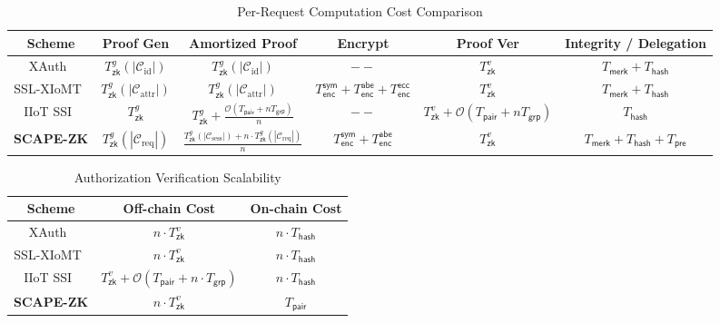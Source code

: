 \documentclass[conference]{IEEEtran}
\begin{document}
\begin{table}[t]
\centering
\caption{Per-Request Computation Cost Comparison}
\label{tab:cost-unified}
\begin{tabular}{c|c|c|c|c|c}
\hline
\textbf{Scheme} 
& \textbf{Proof Gen} 
& \textbf{Amortized Proof} 
& \textbf{Encrypt} 
& \textbf{Proof Ver} 
& \textbf{Integrity / Delegation} \\
\hline

XAuth~\cite{b6}
& $T_{\mathsf{zk}}^{g}(|\mathcal{C}_{\mathrm{id}}|)$
& $T_{\mathsf{zk}}^{g}(|\mathcal{C}_{\mathrm{id}}|)$
& $--$
& $T_{\mathsf{zk}}^{v}$
& $T_{\mathsf{merk}} + T_{\mathsf{hash}}$ \\
\hline

SSL-XIoMT~\cite{b8}
& $T_{\mathsf{zk}}^{g}(|\mathcal{C}_{\mathrm{attr}}|)$
& $T_{\mathsf{zk}}^{g}(|\mathcal{C}_{\mathrm{attr}}|)$
& $T_{\mathsf{enc}}^{\mathsf{sym}} + T_{\mathsf{enc}}^{\mathsf{abe}} + T_{\mathsf{enc}}^{\mathsf{ecc}}$
& $T_{\mathsf{zk}}^{v}$
& $T_{\mathsf{merk}} + T_{\mathsf{hash}}$ \\
\hline

IIoT SSI~\cite{b30}
& $T_{\mathsf{zk}}^{g}$
& $\displaystyle T_{\mathsf{zk}}^{g} + \frac{\mathcal{O}(T_{\mathsf{pair}} + nT_{\mathsf{grp}})}{n}$
& $--$
& $T_{\mathsf{zk}}^{v} + \mathcal{O}(T_{\mathsf{pair}} + nT_{\mathsf{grp}})$
& $T_{\mathsf{hash}}$ \\
\hline

\textbf{SCAPE-ZK}
& $T_{\mathsf{zk}}^{g}(|\mathcal{C}_{\mathrm{req}}|)$
& $\displaystyle \frac{T_{\mathsf{zk}}^{g}(|\mathcal{C}_{\mathrm{sess}}|) + n \cdot T_{\mathsf{zk}}^{g}(|\mathcal{C}_{\mathrm{req}}|)}{n}$
& $T_{\mathsf{enc}}^{\mathsf{sym}} + T_{\mathsf{enc}}^{\mathsf{abe}}$
& $T_{\mathsf{zk}}^{v}$
& $T_{\mathsf{merk}} + T_{\mathsf{hash}} + T_{\mathsf{pre}}$ \\
\hline

\end{tabular}
\end{table}

\begin{table}[t]
\centering
\caption{Authorization Verification Scalability}
\label{tab:scalability}
\begin{tabular}{c|c|c}
\hline
\textbf{Scheme} & \textbf{Off-chain Cost} & \textbf{On-chain Cost} \\
\hline
XAuth~\cite{b6}
& $n \cdot T_{\mathsf{zk}}^{v}$
& $n \cdot T_{\mathsf{hash}}$ \\
\hline
SSL-XIoMT~\cite{b8}
& $n \cdot T_{\mathsf{zk}}^{v}$
& $n \cdot T_{\mathsf{hash}}$ \\
\hline
IIoT SSI~\cite{b30}
& $T_{\mathsf{zk}}^{v} + \mathcal{O}(T_{\mathsf{pair}} + n \cdot T_{\mathsf{grp}})$
& $n \cdot T_{\mathsf{hash}}$ \\
\hline
\textbf{SCAPE-ZK}
& $n \cdot T_{\mathsf{zk}}^{v}$
& $T_{\mathsf{pair}}$ \\
\hline
\end{tabular}
\end{table}
\end{document}
